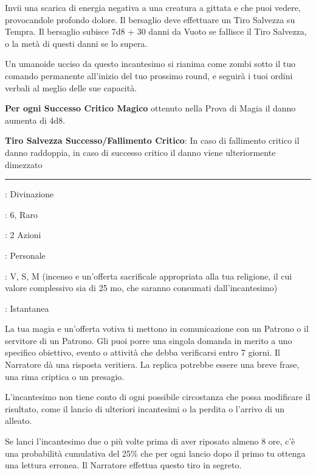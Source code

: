 \begin{multicols}{2}
Invii una scarica di energia negativa a una creatura a gittata e che puoi vedere, provocandole profondo dolore. Il bersaglio deve effettuare un Tiro Salvezza su Tempra. Il bersaglio subisce 7d8 + 30 danni da Vuoto se fallisce il Tiro Salvezza, o la metà di questi danni se lo supera.

Un umanoide ucciso da questo incantesimo si rianima come zombi sotto il tuo comando permanente all'inizio del tuo prossimo round, e seguirà i tuoi ordini verbali al meglio delle sue capacità.

\textbf{Per ogni Successo Critico Magico} ottenuto nella Prova di Magia il danno aumenta di 4d8.

\textbf{Tiro Salvezza Successo/Fallimento Critico}: In caso di fallimento critico il danno raddoppia, in caso di successo critico il danno viene ulteriormente dimezzato

\smallskip\noindent\rule{\linewidth}{2pt} \hypertarget{Divinazione}{}\medskip{}
\noindent
\begin{description}[noitemsep, topsep=0pt, parsep=0pt, partopsep=0pt, leftmargin=0cm, labelwidth=2.8cm]
	\item[\textbf{Lista di Magia}]: Divinazione
	\item[\textbf{Livello}]: 6, Raro
	\item[\textbf{T. di Lancio}]: 2 Azioni
	\item[\textbf{Gittata}]: Personale
	\item[\textbf{Componenti}]: V, S, M (incenso e un'offerta sacrificale appropriata alla tua religione, il cui valore complessivo sia di 25 mo, che saranno consumati dall'incantesimo)
	\item[\textbf{Durata}]: Istantanea
\end{description}

La tua magia e un'offerta votiva ti mettono in comunicazione con un Patrono o il servitore di un Patrono. Gli puoi porre una singola domanda in merito a uno specifico obiettivo, evento o attività che debba verificarsi entro 7 giorni. Il Narratore dà una risposta veritiera. La replica potrebbe essere una breve frase, una rima criptica o un presagio.

L'incantesimo non tiene conto di ogni possibile circostanza che possa modificare il risultato, come il lancio di ulteriori incantesimi o la perdita o l'arrivo di un alleato.

Se lanci l'incantesimo due o più volte prima di aver riposato almeno 8 ore, c'è una probabilità cumulativa del 25\% che per ogni lancio dopo il primo tu ottenga una lettura erronea. Il Narratore effettua questo tiro in segreto.


\end{multicols}
